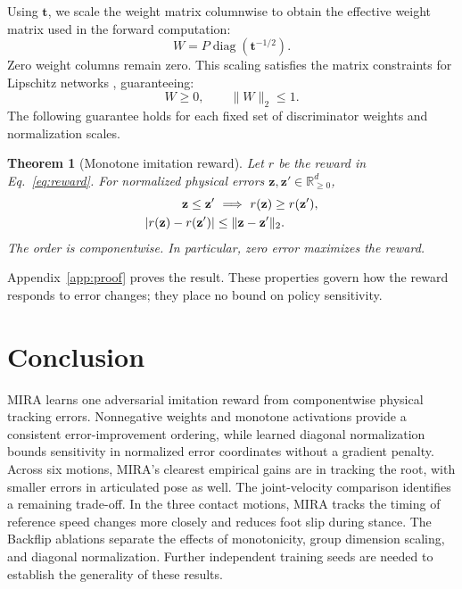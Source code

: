 \documentclass[letterpaper, 10pt, conference]{ieeeconf}
\newtheorem{theorem}{Theorem}
\begin{document}
Using $\mathbf t$, we scale the weight matrix columnwise to obtain the
effective weight matrix used in the forward computation:
\begin{equation}
W=P\operatorname{diag}(\mathbf t^{-1/2}).
\label{eq:diagonal_weights}
\end{equation}
Zero weight columns remain zero. This scaling satisfies the matrix
constraints for Lipschitz networks \cite{araujo2023unified}, guaranteeing:
\begin{equation}
W\geq0,\qquad \|W\|_2\leq1.
\label{eq:diagonal_bound}
\end{equation}
The following guarantee holds for each fixed set of discriminator weights
and normalization scales.

\begin{theorem}[Monotone imitation reward]
\label{thm:reward}
Let $r$ be the reward in Eq.~\eqref{eq:reward}. For normalized physical
errors $\mathbf z,\mathbf z'\in\mathbb R_{\geq0}^{d}$,
\begin{align}
\mathbf z\leq\mathbf z'&\ \Longrightarrow\ r(\mathbf z)\geq r(\mathbf z'),\notag\\
|r(\mathbf z)-r(\mathbf z')|&\leq\|\mathbf z-\mathbf z'\|_2 .
\end{align}
The order is componentwise. In particular, zero error maximizes the reward.
\end{theorem}
Appendix~\ref{app:proof} proves the result. These properties govern how the
reward responds to error changes; they place no bound on policy sensitivity.



\section{Conclusion}
MIRA learns one adversarial imitation reward from componentwise physical
tracking errors. Nonnegative weights and monotone activations provide a
consistent error-improvement ordering, while learned diagonal
normalization bounds sensitivity in normalized error coordinates without
a gradient penalty. Across six motions, MIRA's clearest empirical gains
are in tracking the root, with smaller errors in articulated pose as well.
The joint-velocity comparison identifies a remaining trade-off. In the
three contact motions, MIRA tracks the timing of reference speed changes
more closely and reduces foot slip during stance. The Backflip ablations
separate the effects of monotonicity, group dimension scaling, and
diagonal normalization. Further independent training seeds are needed to
establish the generality of these results.
\end{document}
